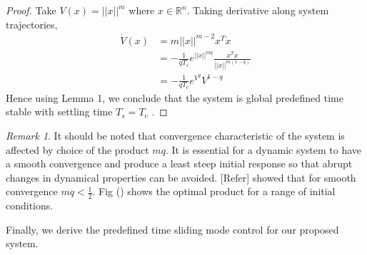 \documentclass[]{article}
\theoremstyle{remark}
\newtheorem{remark}{Remark}
\theoremstyle{definition}
\begin{document}
\begin{proof}
	Take $ V(x) = ||x||^m $ where $ x\in \mathbb{R}^n $.
	Taking derivative along system trajectories,
\begin{align}
\dot V(x) &= m||x||^{m-2}x^T\dot x \\
& = -\frac{1}{qT_c}e^{||x||^{mq}}\frac{x^Tx}{||x||^{m(1-q)}} \\
& = -\frac{1}{qT_c}e^{V^q}V^{1-q}
\end{align}
Hence using Lemma 1, we conclude that the system is global predefined time stable with settling time $ T_s = T_c $ .
\end{proof}
\begin{remark}
It should be noted that convergence characteristic of the system is affected by choice of the product $ mq $. It is essential for a dynamic system to have a smooth convergence and produce a least steep initial response so that abrupt changes in dynamical properties can be avoided. [Refer] showed that for smooth convergence $ mq < \frac{1}{2} $. Fig ()  shows the optimal product for a range of initial conditions. 
\end{remark}
Finally, we derive the predefined time sliding mode control for our proposed system.
\end{document}
